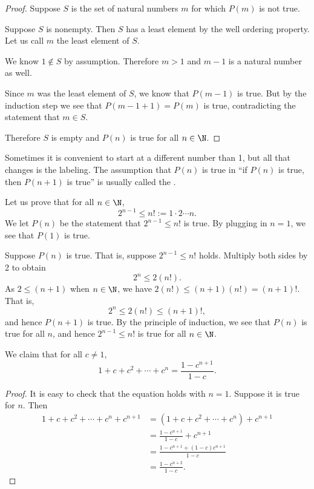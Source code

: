 \documentclass[12pt]{book}
\begin{document}
\begin{proof}
Suppose $S$ is the set of natural numbers $m$ for which $P(m)$ is
not true.  

Suppose $S$ is nonempty.  
Then $S$ has a least element by the well ordering property.  
Let us call $m$ the least element of $S$. 

We know $1 \notin S$ by assumption.
Therefore $m > 1$ and $m-1$ is a natural number as well.

Since $m$ was the least element of $S$, we know that $P(m-1)$ is true.
But by the induction step we see that $P(m-1+1) = P(m)$ is true, 
contradicting the statement that $m \in S$.  

Therefore $S$ is empty and $P(n)$ is true for all $n \in \N$.
\end{proof}

Sometimes it is convenient to start at a different number than 1, but 
all that changes is the labeling.
The assumption that
$P(n)$ is true in ``if $P(n)$ is true,
then $P(n+1)$ is true''
is usually called the \emph{}.

\begin{example}
Let us prove that for all $n \in \N$,
\begin{equation*}
2^{n-1} \leq n! := 1\cdot 2\cdots n.
\end{equation*}
We let $P(n)$ be the statement that
$2^{n-1} \leq n!$ is true.
By plugging in $n=1$, we see that $P(1)$
is true.

Suppose $P(n)$ is true.
That is, suppose 
$2^{n-1} \leq n!$ holds.
Multiply both sides by 2 to obtain
\begin{equation*}
2^n \leq 2(n!) .
\end{equation*}
As $2 \leq (n+1)$ when $n \in \N$, we have
$2(n!) \leq (n+1)(n!) = (n+1)!$.
That is,
\begin{equation*}
2^n \leq 2(n!) \leq  (n+1)!,
\end{equation*}
and hence $P(n+1)$ is true.
By the principle of induction, we see that
$P(n)$
is true for all $n$, and hence
$2^{n-1} \leq n!$ is true for all $n \in \N$.
\end{example}

\begin{example}
We claim that for all $c \not= 1$,
\begin{equation*}
1 + c + c^2 + \cdots + c^n = \frac{1-c^{n+1}}{1-c} .
\end{equation*}
\begin{proof} It is easy to check that the equation holds with $n=1$.  Suppose 
it is true for $n$.
Then
\begin{equation*}
\begin{split}
1 + c + c^2 + \cdots + c^n + c^{n+1} & =
( 1 + c + c^2 + \cdots + c^n ) + c^{n+1} \\
& = \frac{1-c^{n+1}}{1-c}  + c^{n+1} \\
& = \frac{1-c^{n+1}  + (1-c)c^{n+1}}{1-c} \\
& = \frac{1-c^{n+2}}{1-c} .
\end{split}
\end{equation*}
\end{proof}
\end{example}
\end{document}

